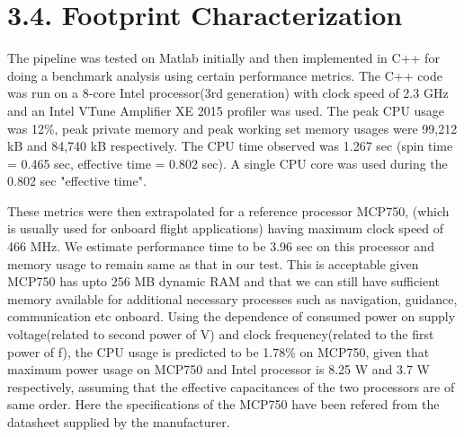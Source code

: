 \documentclass{article}
\title{}
\author{}
\date{\vspace{-5ex}}
\begin{document}
	\maketitle
	
	\section*{3.4. Footprint Characterization}
The pipeline was tested on Matlab initially and then implemented in C++ for doing a benchmark analysis using certain performance metrics. The C++ code was run on a 8-core Intel processor(3rd generation) with clock speed of 2.3 GHz and an Intel VTune Amplifier XE 2015 profiler was used. The peak CPU usage was 12\%, peak private memory and peak working set memory usages were 99,212 kB and 84,740 kB respectively. The CPU time observed was 1.267 sec (spin time = 0.465 sec, effective time = 0.802 sec). A single CPU core was used during the 0.802 sec "effective time". \newline

These metrics were then extrapolated for a reference processor MCP750, (which is usually used for onboard flight applications)  having maximum clock speed of 466 MHz. We estimate performance time to be 3.96 sec on this processor and memory usage to remain same as that in our test.  This is acceptable given MCP750 has upto 256 MB dynamic RAM and that we can still have sufficient memory available for additional necessary processes such as navigation, guidance, communication etc onboard. Using the dependence of consumed power on supply voltage(related to second power of V) and clock frequency(related to the first power of f), the CPU usage is predicted to be 1.78\% on MCP750, given that maximum power usage on MCP750 and Intel processor is 8.25 W and 3.7 W respectively, assuming that the effective capacitances of the two processors are of same order. Here the specifications of the MCP750 have been refered from the datasheet supplied by the manufacturer. 


	
\end{document}
